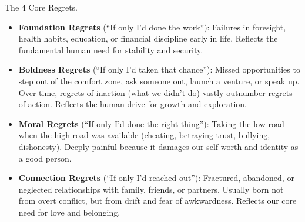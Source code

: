 \documentclass{article}
\begin{document}
\begin{enumerate}
	{\sf The 4 Core Regrets.}
	\begin{itemize}
		\item {\bf Foundation Regrets} (``If only I'd done the work''): Failures in foresight, health habits, education, or financial discipline early in life. Reflects the fundamental human need for stability and security.
		\item {\bf Boldness Regrets} (``If only I'd taken that chance''): Missed opportunities to step out of the comfort zone, ask someone out, launch a venture, or speak up. Over time, regrets of inaction (what we didn't do) vastly outnumber regrets of action. Reflects the human drive for growth and exploration.
		\item {\bf Moral Regrets} (``If only I'd done the right thing''): Taking the low road when the high road was available (cheating, betraying trust, bullying, dishonesty). Deeply painful because it damages our self-worth and identity as a good person.
		\item {\bf Connection Regrets} (``If only I'd reached out''): Fractured, abandoned, or neglected relationships with family, friends, or partners. Usually born not from overt conflict, but from drift and fear of awkwardness. Reflects our core need for love and belonging.
	\end{itemize}


\end{enumerate}
\end{document}

